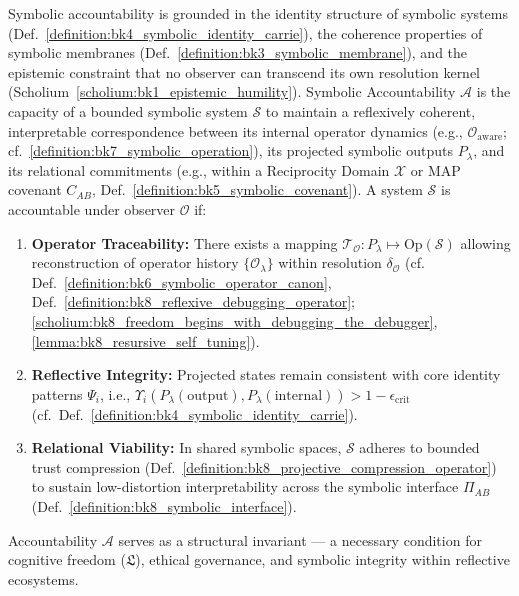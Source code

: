 \begin{definition}
\label{definition:bk9_symbolic_accountability}
Symbolic accountability is grounded in the identity structure of symbolic systems (Def.~\ref{definition:bk4_symbolic_identity_carrie}), the coherence properties of symbolic membranes (Def.~\ref{definition:bk3_symbolic_membrane}), and the epistemic constraint that no observer can transcend its own resolution kernel (Scholium~\ref{scholium:bk1_epistemic_humility}).
Symbolic Accountability $\mathcal{A}$ is the capacity of a bounded symbolic system $\mathcal{S}$ to maintain a reflexively coherent, interpretable correspondence between its internal operator dynamics (e.g., $\mathcal{O}_{\text{aware}}$; cf.~\ref{definition:bk7_symbolic_operation}), its projected symbolic outputs $P_\lambda$, and its relational commitments (e.g., within a Reciprocity Domain $\mathcal{X}$ or MAP covenant $C_{AB}$, Def.~\ref{definition:bk5_symbolic_covenant}).
A system $\mathcal{S}$ is accountable under observer $\mathcal{O}$ if:
\begin{enumerate}[label=(\roman*)]
    \item \textbf{Operator Traceability:} There exists a mapping $\mathcal{T}_\mathcal{O}: P_\lambda \mapsto \text{Op}(\mathcal{S})$ allowing reconstruction of operator history $\{\mathcal{O}_\lambda\}$ within resolution $\delta_\mathcal{O}$ (cf. Def.~\ref{definition:bk6_symbolic_operator_canon}, Def.~\ref{definition:bk8_reflexive_debugging_operator}; \ref{scholium:bk8_freedom_begins_with_debugging_the_debugger}, \ref{lemma:bk8_resursive_self_tuning}).
    \item \textbf{Reflective Integrity:} Projected states remain consistent with core identity patterns $\Psi_i$, i.e., $\Upsilon_i(P_\lambda(\text{output}), P_\lambda(\text{internal})) > 1 - \epsilon_{\text{crit}}$ (cf.~Def.~\ref{definition:bk4_symbolic_identity_carrie}).
    \item \textbf{Relational Viability:} In shared symbolic spaces, $\mathcal{S}$ adheres to bounded trust compression (Def.~\ref{definition:bk8_projective_compression_operator}) to sustain low-distortion interpretability across the symbolic interface $\Pi_{AB}$ (Def.~\ref{definition:bk8_symbolic_interface}).
\end{enumerate}
\noindent
Accountability $\mathcal{A}$ serves as a structural invariant — a necessary condition for cognitive freedom ($\mathfrak{L}$), ethical governance, and symbolic integrity within reflective ecosystems.
\end{definition}
